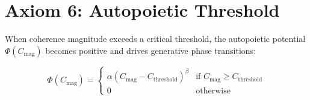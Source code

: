 \section{Axiom 6: Autopoietic Threshold}

When coherence magnitude exceeds a critical threshold, the autopoietic potential \(\Phi(C_{\text{mag}})\) becomes positive and drives generative phase transitions:

\begin{equation}
\Phi(C_{\text{mag}}) = \begin{cases}
\alpha (C_{\text{mag}} - C_{\text{threshold}})^{\beta} & \text{if } C_{\text{mag}} \geq C_{\text{threshold}} \\
0 & \text{otherwise}
\end{cases}
\end{equation} 